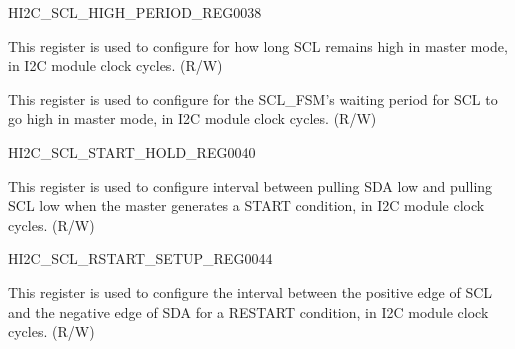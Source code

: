 \begin{register}{H}{I2C\_SCL\_HIGH\_PERIOD\_REG}{\hexprefix{}0038}\label{regdesc:I2CSCLHIGHPERIODREG}
%
%
%
\regnewline%
\begin{regdesc}\begin{reglist}
\label{fielddesc:I2CSCLHIGHPERIOD}\item [I2C\_SCL\_HIGH\_PERIOD] This register is used to configure for how long SCL remains high in master mode, in I2C module clock cycles. (R/W)
\label{fielddesc:I2CSCLWAITHIGHPERIOD}\item [I2C\_SCL\_WAIT\_HIGH\_PERIOD] This register is used to configure for the SCL\_FSM's waiting period for SCL to go high in master mode, in I2C module clock cycles. (R/W)
\end{reglist}\end{regdesc}
\end{register}


\begin{register}{H}{I2C\_SCL\_START\_HOLD\_REG}{\hexprefix{}0040}\label{regdesc:I2CSCLSTARTHOLDREG}
%
%
\regnewline%
\begin{regdesc}\begin{reglist}
\label{fielddesc:I2CSCLSTARTHOLDTIME}\item [I2C\_SCL\_START\_HOLD\_TIME] This register is used to configure  interval between pulling SDA low and pulling SCL low when the master generates a START condition, in I2C module clock cycles. (R/W)
\end{reglist}\end{regdesc}
\end{register}


\begin{register}{H}{I2C\_SCL\_RSTART\_SETUP\_REG}{\hexprefix{}0044}\label{regdesc:I2CSCLRSTARTSETUPREG}
%
%
\regnewline%
\begin{regdesc}\begin{reglist}
\label{fielddesc:I2CSCLRSTARTSETUPTIME}\item [I2C\_SCL\_RSTART\_SETUP\_TIME] This register is used to configure the interval between the positive edge of SCL and the negative edge of SDA for a RESTART condition, in I2C module clock cycles. (R/W)
\end{reglist}\end{regdesc}
\end{register}


